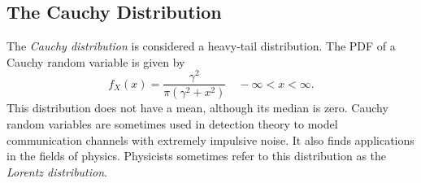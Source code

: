 \subsection{The Cauchy Distribution}
The \emph{Cauchy distribution} is considered a heavy-tail distribution. 
The PDF of a Cauchy random variable is given by
\begin{equation*}
f_X (x) = \frac{ \gamma^2 }{\pi \left( \gamma^2 + x^2 \right)} \quad - \infty < x < \infty.
\end{equation*}
This distribution does not have a mean, although its median is zero.
Cauchy random variables are sometimes used in detection theory to model communication channels with extremely impulsive noise.
It also finds applications in the fields of physics.
Physicists sometimes refer to this distribution as the \emph{Lorentz distribution}.

